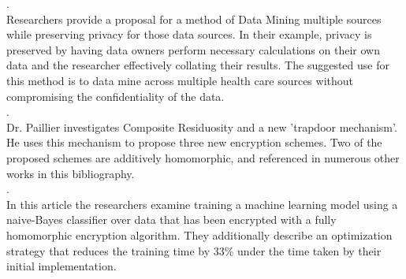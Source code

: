 \documentclass[]{article}
\begin{document}
	.
	\vspace{1em}\\
	Researchers provide a proposal for a method of Data Mining multiple sources while preserving privacy for those data sources. In their example, privacy is preserved by having data owners perform necessary calculations on their own data and the researcher effectively collating their results. The suggested use for this method is to data mine across multiple health care sources without compromising the confidentiality of the data.
	\vspace{1em}\\

	.
	\vspace{1em}\\
	Dr. Paillier investigates Composite Residuosity and a new 'trapdoor mechanism'. He uses this mechanism to propose three new encryption schemes. Two of the proposed schemes are additively homomorphic, and referenced in numerous other works in this bibliography. 
	\vspace{1em}\\
	
	.
	\vspace{1em}\\
	In this article the researchers examine training a machine learning model using a naive-Bayes classifier over data that has been encrypted with a fully homomorphic encryption algorithm. They additionally describe an optimization strategy that reduces the training time by 33\% under the time taken by their initial implementation.
	\vspace{1em}\\
	

% 
\end{document}
